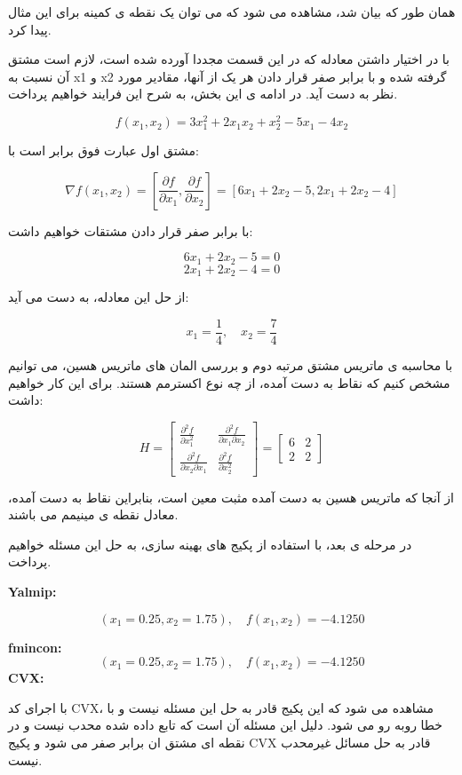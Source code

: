 همان طور که بیان شد، مشاهده می شود که می توان یک نقطه ی کمینه برای این مثال پیدا کرد.

با در اختیار داشتن معادله که در این قسمت مجددا آورده شده است، لازم است مشتق آن نسبت به x1 و x2 گرفته شده و با برابر صفر قرار دادن هر یک از آنها، مقادیر مورد نظر به دست آید. در ادامه ی این بخش، به شرح این فرایند خواهیم پرداخت.

\[
f(x_1, x_2) = 3x_1^2 + 2x_1x_2 + x_2^2 - 5x_1 - 4x_2
\]


مشتق اول عبارت فوق برابر است با:

\[
\nabla f(x_1, x_2) = \left[ \frac{\partial f}{\partial x_1}, \frac{\partial f}{\partial x_2} \right] = \left[ 6x_1 + 2x_2 - 5, 2x_1 + 2x_2 - 4 \right]
\]

با برابر صفر قرار دادن مشتقات خواهیم داشت:

\[
6x_1 + 2x_2 - 5 = 0
\]
\[
2x_1 + 2x_2 - 4 = 0
\]


از حل این معادله، به دست می آید:

\[
x_1 = \frac{1}{4}, \quad
x_2 = \frac{7}{4}
\]

با محاسبه ی ماتریس مشتق مرتبه دوم و بررسی المان های ماتریس هسین، می توانیم مشخص کنیم که نقاط به دست آمده، از چه نوع اکسترمم هستند. برای این کار خواهیم داشت:

\[
H = \begin{bmatrix}
	\frac{\partial^2 f}{\partial x_1^2} & \frac{\partial^2 f}{\partial x_1 \partial x_2} \\
	\frac{\partial^2 f}{\partial x_2 \partial x_1} & \frac{\partial^2 f}{\partial x_2^2}
\end{bmatrix} = \begin{bmatrix}
	6 & 2 \\
	2 & 2
\end{bmatrix}
\]

از آنجا که ماتریس هسین به دست آمده مثبت معین است، بنابراین نقاط به دست آمده، معادل نقطه ی مینیمم می باشند.

در مرحله ی بعد، با استفاده از پکیج های بهینه سازی، به حل این مسئله خواهیم پرداخت.

\textbf{Yalmip:}


\[
(x_1 = 0.25, x_2 = 1.75) , \quad f(x_1, x_2) = -4.1250
\]

\textbf{fmincon:}
\[
(x_1 = 0.25, x_2 = 1.75) , \quad f(x_1, x_2) = -4.1250
\]
\textbf{CVX:}


با اجرای کد CVX، مشاهده می شود که این پکیج قادر به حل این مسئله نیست و با خطا روبه رو می شود. دلیل این مسئله آن است که تابع داده شده محدب نیست و در نقطه ای مشتق ان برابر صفر می شود و پکیج 
CVX 
قادر به حل مسائل غیرمحدب نیست.

